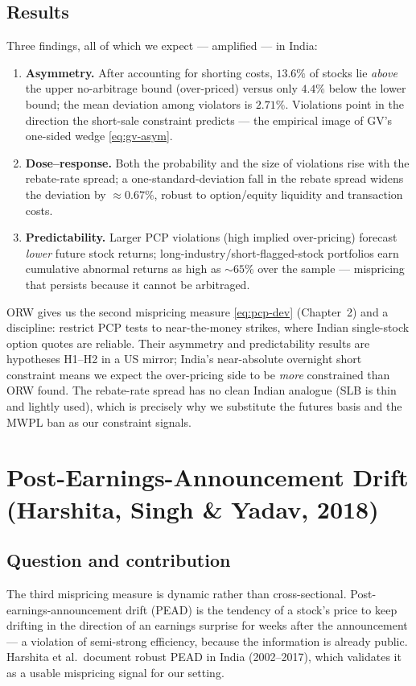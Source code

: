\subsection*{Results}
Three findings, all of which we expect --- amplified --- in India:
\begin{enumerate}[leftmargin=1.4em,itemsep=2pt]
\item \textbf{Asymmetry.} After accounting for shorting costs, $13.6\%$ of stocks lie \emph{above} the upper no-arbitrage bound (over-priced) versus only $4.4\%$ below the lower bound; the mean deviation among violators is $2.71\%$. Violations point in the direction the short-sale constraint predicts --- the empirical image of GV's one-sided wedge \eqref{eq:gv-asym}.
\item \textbf{Dose--response.} Both the probability and the size of violations rise with the rebate-rate spread; a one-standard-deviation fall in the rebate spread widens the deviation by $\approx 0.67\%$, robust to option/equity liquidity and transaction costs.
\item \textbf{Predictability.} Larger PCP violations (high implied over-pricing) forecast \emph{lower} future stock returns; long-industry/short-flagged-stock portfolios earn cumulative abnormal returns as high as $\sim 65\%$ over the sample --- mispricing that persists because it cannot be arbitraged.
\end{enumerate}

\begin{takeaway}
ORW gives us the second mispricing measure \eqref{eq:pcp-dev} (Chapter~2) and a discipline: restrict PCP tests to near-the-money strikes, where Indian single-stock option quotes are reliable. Their asymmetry and predictability results are hypotheses H1--H2 in a US mirror; India's near-absolute overnight short constraint means we expect the over-pricing side to be \emph{more} constrained than ORW found. The rebate-rate spread has no clean Indian analogue (SLB is thin and lightly used), which is precisely why we substitute the futures basis and the MWPL ban as our constraint signals.
\end{takeaway}

\section{Post-Earnings-Announcement Drift (Harshita, Singh \& Yadav, 2018)}
\label{sec:pead}

\subsection*{Question and contribution}
The third mispricing measure is dynamic rather than cross-sectional. Post-earnings-announcement drift (PEAD) is the tendency of a stock's price to keep drifting in the direction of an earnings surprise for weeks after the announcement --- a violation of semi-strong efficiency, because the information is already public. Harshita et al.\ document robust PEAD in India (2002--2017), which validates it as a usable mispricing signal for our setting.

